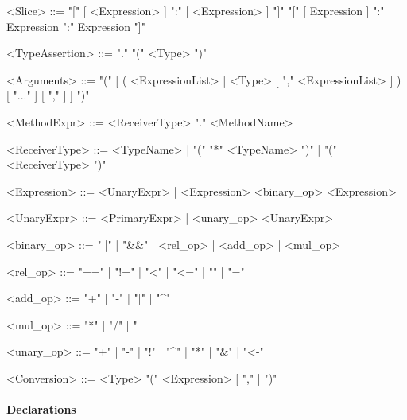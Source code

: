 \documentclass{article}
\begin{document}
\begin{grammar}
        <Slice>             ::=     "[" [ <Expression> ] ":" [ <Expression> ] "]"
                            \alt    "[" [ Expression ] ":" Expression ":" Expression "]"

        <TypeAssertion>     ::=     "." "(" <Type> ")"

        <Arguments>         ::=     "(" [ ( <ExpressionList> | <Type> [ "," <ExpressionList> ] ) [ "..." ] [ "," ] ] ")"

        <MethodExpr>        ::=     <ReceiverType> "." <MethodName>

        <ReceiverType>      ::=     <TypeName> | "(" "*" <TypeName> ")" | "(" <ReceiverType> ")"

        <Expression>        ::=     <UnaryExpr> | <Expression> <binary_op> <Expression>

        <UnaryExpr>         ::=     <PrimaryExpr> | <unary_op> <UnaryExpr>

        <binary_op>         ::=     "||" | "&&" | <rel_op> | <add_op> | <mul_op>

        <rel_op>            ::=     "==" | "!=" | "<" | "<=" | "\>" | "\>="

        <add_op>            ::=     "+" | "-" | "|" | "^"

        <mul_op>            ::=     "*" | "/" | "%
        
        <unary_op>          ::=     "+" | "-" | "!" | "^" | "*" | "&" | "<-"

        <Conversion>        ::=     <Type> "(" <Expression> [ "," ] ")"

    \end{grammar}

    \paragraph{Declarations}
\end{document}
